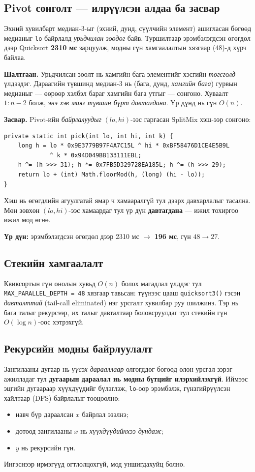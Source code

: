 \documentclass[11pt,a4paper]{article}
\begin{document}
\subsection{Pivot сонголт --- илрүүлсэн алдаа ба засвар}
Эхний хувилбарт медиан-3-ыг (эхний, дунд, сүүлчийн элемент) ашигласан бөгөөд
медианыг \texttt{lo} байрлалд \emph{урьдчилан зөөдөг} байв. Туршилтаар
эрэмбэлэгдсэн өгөгдөл дээр Quicksort \textbf{2310 мс} зарцуулж, модны гүн
хамгаалалтын хязгаар (48)-д хүрч байлаа.

\textbf{Шалтгаан.} Урьдчилсан зөөлт нь хамгийн бага элементийг хэсгийн
\emph{төгсгөлд} үлдээдэг. Дараагийн түвшинд медиан-3 нь (бага, дунд,
\emph{хамгийн бага}) гурвын медианыг --- өөрөөр хэлбэл бараг хамгийн бага
утгыг --- сонгоно. Хуваалт $1 : n-2$ болж, \emph{энэ хэв маяг түвшин бүрт
давтагдана}. Үр дүнд нь гүн $O(n)$.

\textbf{Засвар.} Pivot-ийн \emph{байрлалуудыг} $(lo, hi)$-ээс гаргасан
SplitMix хэш-ээр сонгоно:
\begin{lstlisting}
private static int pick(int lo, int hi, int k) {
    long h = lo * 0x9E3779B97F4A7C15L ^ hi * 0xBF58476D1CE4E5B9L
             ^ k * 0x94D049BB133111EBL;
    h ^= (h >>> 31); h *= 0x7FB5D329728EA185L; h ^= (h >>> 29);
    return lo + (int) Math.floorMod(h, (long) (hi - lo));
}
\end{lstlisting}
Хэш нь өгөгдлийн агуулгатай ямар ч хамааралгүй тул дээрх давхарлалыг тасална.
Мөн зөвхөн $(lo, hi)$-ээс хамаардаг тул үр дүн \textbf{давтагдана} --- ижил
тохиргоо ижил мод өгнө.

\textbf{Үр дүн:} эрэмбэлэгдсэн өгөгдөл дээр 2310 мс $\to$ \textbf{196 мс},
гүн $48 \to 27$.

\subsection{Стекийн хамгаалалт}
Квиксортын гүн онолын хувьд $O(n)$ болох магадлал үлддэг тул
\texttt{MAX\_PARALLEL\_DEPTH = 48} хязгаар тавьсан: түүнээс цааш
\texttt{quicksort3()} гэсэн \emph{давталттай} (tail-call eliminated) нэг урсгалт
хувилбар руу шилжинэ. Тэр нь бага талыг рекурсээр, их талыг давталтаар
боловсруулдаг тул стекийн гүн $O(\log n)$-оос хэтрэхгүй.

\subsection{Рекурсийн модны байрлуулалт}
Зангилааны дугаар нь \emph{үүсэх дарааллаар} олгогддог бөгөөд олон урсгал
зэрэг ажилладаг тул \textbf{дугаарын дараалал нь модны бүтцийг илэрхийлэхгүй}.
Иймээс эцгийн дугаараар хүүхдүүдийг бүлэглэж, \texttt{lo}-оор эрэмбэлж,
гүнзгийрүүлсэн хайлтаар (DFS) байрлалыг тооцоолно:
\begin{itemize}[nosep,leftmargin=*]
  \item навч бүр дараалсан $x$ байрлал эзэлнэ;
  \item дотоод зангилааны $x$ нь \emph{хүүхдүүдийнхээ дундаж};
  \item $y$ нь рекурсийн гүн.
\end{itemize}
Ингэснээр ирмэгүүд огтлолцохгүй, мод уншигдахуйц болно.
\newpage
\end{document}

